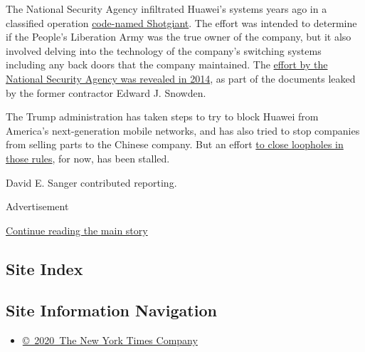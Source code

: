The National Security Agency infiltrated Huawei's systems years ago in a
classified operation
\href{https://www.nytimes.com/2014/03/23/world/asia/nsa-breached-chinese-servers-seen-as-spy-peril.html}{code-named
Shotgiant}. The effort was intended to determine if the People's
Liberation Army was the true owner of the company, but it also involved
delving into the technology of the company's switching systems including
any back doors that the company maintained. The
\href{https://www.nytimes.com/2014/03/23/world/asia/nsa-breached-chinese-servers-seen-as-spy-peril.html}{effort
by the National Security Agency was revealed in 2014}, as part of the
documents leaked by the former contractor Edward J. Snowden.

The Trump administration has taken steps to try to block Huawei from
America's next-generation mobile networks, and has also tried to stop
companies from selling parts to the Chinese company. But an effort
\href{https://www.nytimes.com/2020/01/24/business/economy/huawei-restrictions.html}{to
close loopholes in those rules}, for now, has been stalled.

David E. Sanger contributed reporting.

Advertisement

\protect\hyperlink{after-bottom}{Continue reading the main story}

\hypertarget{site-index}{%
\subsection{Site Index}\label{site-index}}

\hypertarget{site-information-navigation}{%
\subsection{Site Information
Navigation}\label{site-information-navigation}}

\begin{itemize}
\tightlist
\item
  \href{https://help.nytimes.com/hc/en-us/articles/115014792127-Copyright-notice}{©~2020~The
  New York Times Company}
\end{itemize}

